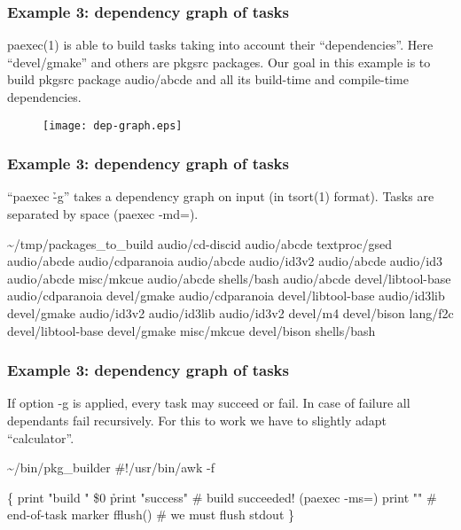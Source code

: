 \documentclass[hyperref={colorlinks=true}]{beamer}
\begin{document}
\begin{frame}[fragile]
  \frametitle{Example 3: dependency graph of tasks}
  paexec(1) is able to build tasks taking into account their ``dependencies''.
Here ``devel/gmake'' and others are pkgsrc packages. Our goal in this example
is to build pkgsrc package audio/abcde and all its build-time and compile-time
dependencies.
  \begin{block}{}
    \begin{figure}
      \texttt{[image: dep-graph.eps]}
    \end{figure}
  \end{block}
\end{frame}

\begin{frame}[fragile]
  \frametitle{Example 3: dependency graph of tasks}
``paexec \h{-g}'' takes a dependency graph on input (in tsort(1) format).
Tasks are separated by space (paexec -md=).
  \begin{block}{}
      \begin{CodeSmall}{\~{}/tmp/packages\_to\_build}
audio/cd-discid audio/abcde
textproc/gsed audio/abcde
audio/cdparanoia audio/abcde
audio/id3v2 audio/abcde
audio/id3 audio/abcde
misc/mkcue audio/abcde
shells/bash audio/abcde
devel/libtool-base audio/cdparanoia
devel/gmake audio/cdparanoia
devel/libtool-base audio/id3lib
devel/gmake audio/id3v2
audio/id3lib audio/id3v2
devel/m4 devel/bison
lang/f2c devel/libtool-base
devel/gmake misc/mkcue
devel/bison shells/bash
      \end{CodeSmall}
  \end{block}
\end{frame}

\begin{frame}[fragile]
  \frametitle{Example 3: dependency graph of tasks}
If option -g is applied, every task may succeed or fail. In case of failure
all dependants fail recursively.
For this to work we have to slightly adapt ``calculator''.
  \begin{block}{}
      \begin{CodeSmall}{\~{}/bin/pkg\_builder}
#!/usr/bin/awk -f

\{
   print "build " \$0
   \h{print "success"} # build succeeded! (paexec -ms=)
   print ""        # end-of-task marker
   fflush()        # we must flush stdout
\}
      \end{CodeSmall}
  \end{block}
\end{frame}
\end{document}
